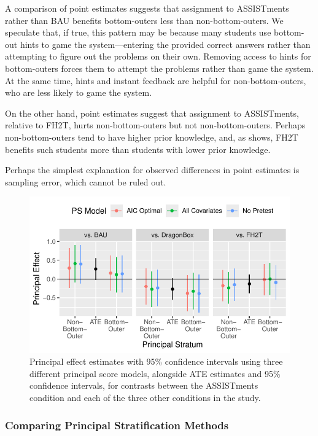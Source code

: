 \documentclass[]{article}
\begin{document}
A comparison of point estimates suggests that assignment to ASSISTments rather than BAU benefits bottom-outers less than non-bottom-outers.
We speculate that, if true, this pattern may be because many students use bottom-out hints to game the system---entering the provided correct answers rather than attempting to figure out the problems on their own.
Removing access to hints for bottom-outers forces them to attempt the problems rather than game the system.
At the same time, hints and instant feedback are helpful for non-bottom-outers, who are less likely to game the system.

On the other hand, point estimates suggest that assignment to ASSISTments, relative to FH2T, hurts non-bottom-outers but not non-bottom-outers.
Perhaps non-bottom-outers tend to have higher prior knowledge, and, as \cite{impactPaper} shows, FH2T benefits such students more than students with lower prior knowledge.

Perhaps the simplest explanation for observed differences in point estimates is sampling error, which cannot be ruled out.

\begin{figure}
  \centering
  \includegraphics{figure/prinEffs.pdf}
  \caption{Principal effect estimates with 95\% confidence intervals using three different principal score models, alongside ATE estimates and 95\% confidence intervals, for contrasts between the ASSISTments condition and each of the three other conditions in the study.}
  \label{fig:effects}
\end{figure}

\subsubsection{Comparing Principal Stratification Methods}
\end{document}
